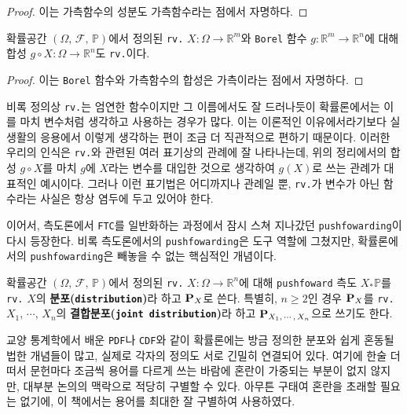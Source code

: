 \begin{proof}
    이는 가측함수의 성분도 가측함수라는 점에서 자명하다.
\end{proof}

\begin{theorem}
    확률공간 $(\Omega,\,\mathcal{F},\,\mathbb{P})$에서 정의된 \texttt{rv.} $X:\Omega\to\mathbb{R}^m$와 \texttt{Borel} 함수 $g:\mathbb{R}^m\to\mathbb{R}^n$에 대해 합성 $g\circ X:\Omega\to\mathbb{R}^n$도 \texttt{rv.}이다.
\end{theorem}

\begin{proof}
    이는 \texttt{Borel} 함수와 가측함수의 합성은 가측이라는 점에서 자명하다.
\end{proof}

비록 정의상 \texttt{rv.}는 엄연한 함수이지만 그 이름에서도 잘 드러나듯이 확률론에서는 이를 마치 변수처럼 생각하고 사용하는 경우가 많다. 이는 이론적인 이유에서라기보다 실생활의 응용에서 이렇게 생각하는 편이 조금 더 직관적으로 편하기 때문이다. 이러한 우리의 인식은 \texttt{rv.}와 관련된 여러 표기상의 관례에 잘 나타나는데, 위의 정리에서의 합성 $g\circ X$를 마치 $g$에 $X$라는 변수를 대입한 것으로 생각하여 $g(X)$로 쓰는 관례가 대표적인 예시이다. 그러나 이런 표기법은 어디까지나 관례일 뿐, \texttt{rv.}가 변수가 아닌 함수라는 사실은 항상 염두에 두고 있어야 한다.

이어서, 측도론에서 \texttt{FTC}를 일반화하는 과정에서 잠시 스쳐 지나갔던 \texttt{pushfowarding}이 다시 등장한다. 비록 측도론에서의 \texttt{pushfowarding}은 도구 역할에 그쳤지만, 확률론에서의 \texttt{pushfowarding}은 빼놓을 수 없는 핵심적인 개념이다.

\begin{definition}
    확률공간 $(\Omega,\,\mathcal{F},\,\mathbb{P})$에서 정의된 \texttt{rv.} $X:\Omega\to\mathbb{R}^n$에 대해 \texttt{pushfoward} 측도 $X_*\mathbb{P}$를 \texttt{rv.} $X$의 \textbf{분포(\texttt{distribution})}라 하고 $\mathbf{P}_X$로 쓴다. 특별히, $n\geq2$인 경우 $\mathbf{P}_X$를 \texttt{rv.} $X_1,\,\cdots,\,X_n$의 \textbf{결합분포(\texttt{joint distribution})}라 하고 $\mathbf{P}_{X_1,\,\cdots,\,X_n}$으로 쓰기도 한다.
\end{definition}

교양 통계학에서 배운 \texttt{PDF}나 \texttt{\texttt{CDF}}와 같이 확률론에는 방금 정의한 분포와 쉽게 혼동될 법한 개념들이 많고, 실제로 각자의 정의도 서로 긴밀히 연결되어 있다. 여기에 한술 더 떠서 문헌마다 조금씩 용어를 다르게 쓰는 바람에 혼란이 가중되는 부분이 없지 않지만, 대부분 논의의 맥락으로 적당히 구별할 수 있다. 아무튼 구태여 혼란을 초래할 필요는 없기에, 이 책에서는 용어를 최대한 잘 구별하여 사용하였다.

